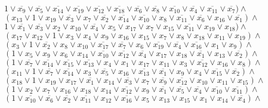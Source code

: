 \documentclass[a4paper,12pt]{article} %
\begin{document}
$1\lor \overline{x_{9}}\lor \overline{x_{5}}\lor \overline{x_{14}}\lor \overline{x_{19}}\lor \overline{x_{12}}\lor \overline{x_{18}}\lor \overline{x_{6}}\lor \overline{x_{8}}\lor \overline{x_{10}}\lor \overline{x_{4}}\lor \overline{x_{11}}\lor \overline{x_{7}})\land$\\
$(x_{13}\lor 1\lor x_{19}\lor \overline{x_{3}}\lor x_{7}\lor \overline{x_{2}}\lor \overline{x_{14}}\lor \overline{x_{10}}\lor x_{8}\lor \overline{x_{11}}\lor \overline{x_{6}}\lor x_{16}\lor \overline{x_{1}})\land$\\
$1\lor \overline{x_{1}}\lor \overline{x_{3}}\lor x_{2}\lor x_{10}\lor \overline{x_{4}}\lor x_{5}\lor x_{17}\lor x_{7}\lor x_{15}\lor \overline{x_{11}}\lor x_{19}\lor x_{18})\land$\\
$(x_{17}\lor x_{12}\lor 1\lor x_{3}\lor x_{4}\lor x_{9}\lor x_{16}\lor x_{15}\lor x_{7}\lor x_{8}\lor x_{18}\lor x_{11}\lor x_{19})\land$\\
$(x_{3}\lor 1\lor \overline{x_{2}}\lor x_{8}\lor x_{10}\lor \overline{x_{17}}\lor \overline{x_{7}}\lor x_{6}\lor \overline{x_{19}}\lor \overline{x_{4}}\lor \overline{x_{16}}\lor x_{1}\lor x_{9})\land$\\
$(1\lor x_{5}\lor x_{9}\lor x_{6}\lor x_{14}\lor \overline{x_{10}}\lor \overline{x_{12}}\lor \overline{x_{4}}\lor x_{17}\lor x_{18}\lor \overline{x_{1}}\lor x_{13}\lor \overline{x_{2}})\land$\\
$(1\lor \overline{x_{7}}\lor \overline{x_{14}}\lor \overline{x_{15}}\lor \overline{x_{13}}\lor x_{4}\lor x_{1}\lor x_{17}\lor x_{11}\lor x_{3}\lor \overline{x_{12}}\lor x_{16}\lor x_{8})\land$\\
$(x_{11}\lor 1\lor \overline{x_{7}}\lor \overline{x_{14}}\lor x_{3}\lor \overline{x_{5}}\lor x_{16}\lor \overline{x_{13}}\lor \overline{x_{1}}\lor x_{9}\lor x_{4}\lor \overline{x_{15}}\lor \overline{x_{2}})\land$\\
$(x_{18}\lor 1\lor x_{19}\lor x_{17}\lor \overline{x_{1}}\lor x_{14}\lor \overline{x_{3}}\lor x_{7}\lor \overline{x_{9}}\lor \overline{x_{12}}\lor x_{10}\lor x_{11}\lor x_{15})\land$\\
$(1\lor x_{2}\lor x_{7}\lor x_{16}\lor x_{18}\lor x_{14}\lor \overline{x_{12}}\lor x_{9}\lor \overline{x_{1}}\lor \overline{x_{5}}\lor \overline{x_{4}}\lor \overline{x_{10}}\lor \overline{x_{11}})\land$\\
$(1\lor \overline{x_{10}}\lor \overline{x_{6}}\lor \overline{x_{2}}\lor \overline{x_{11}}\lor x_{12}\lor \overline{x_{16}}\lor x_{5}\lor x_{13}\lor x_{15}\lor x_{1}\lor x_{14}\lor \overline{x_{4}})\land$\\
\end{document}
